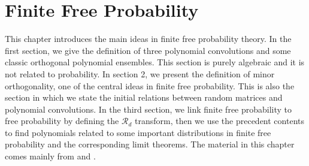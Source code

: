 \chapter{Finite Free Probability} \label{ch:finite_free}

This chapter introduces the main ideas in finite free probability theory. In the first section, we give the definition of three polynomial convolutions and some classic orthogonal polynomial ensembles. This section is purely algebraic and it is not related to probability. In section 2, we present the definition of minor orthogonality, one of the central ideas in finite free probability. This is also the section in which we state the initial relations between random matrices and polynomial convolutions. In the third section, we link finite free probability to free probability by defining the $\mathcal R_d$ transform, then we use the precedent contents to find polynomials related to some important distributions in finite free probability and the corresponding limit theorems. The material in this chapter comes mainly from \cite{article:finitefree, article:marcus_finite} and \cite{anaya2016cumulantes}.



